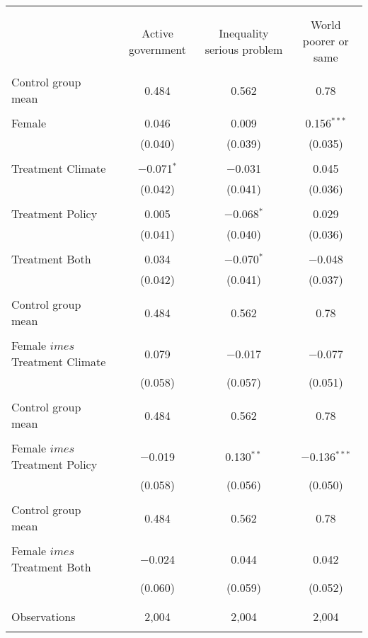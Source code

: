 
\begin{tabular}{@{\extracolsep{5pt}}lccc} 
\\[-1.8ex]\hline 
\hline \\[-1.8ex] 
\\[-1.8ex] & Active government & Inequality serious problem & World poorer or same \\ 
\hline \\[-1.8ex] 
 Control group mean & 0.484 & 0.562 & 0.78  \\ \hline \\[-1.8ex] Female & 0.046 & 0.009 & 0.156$^{***}$ \\ 
  & (0.040) & (0.039) & (0.035) \\ 
  & & & \\ 
 Treatment Climate & $-$0.071$^{*}$ & $-$0.031 & 0.045 \\ 
  & (0.042) & (0.041) & (0.036) \\ 
  & & & \\ 
 Treatment Policy & 0.005 & $-$0.068$^{*}$ & 0.029 \\ 
  & (0.041) & (0.040) & (0.036) \\ 
  & & & \\ 
 Treatment Both & 0.034 & $-$0.070$^{*}$ & $-$0.048 \\ 
  & (0.042) & (0.041) & (0.037) \\ 
  & & & \\ 
 Control group mean & 0.484 & 0.562 & 0.78  \\ \hline \\[-1.8ex] Female $	imes$ Treatment Climate & 0.079 & $-$0.017 & $-$0.077 \\ 
  & (0.058) & (0.057) & (0.051) \\ 
  & & & \\ 
 Control group mean & 0.484 & 0.562 & 0.78  \\ \hline \\[-1.8ex] Female $	imes$ Treatment Policy & $-$0.019 & 0.130$^{**}$ & $-$0.136$^{***}$ \\ 
  & (0.058) & (0.056) & (0.050) \\ 
  & & & \\ 
 Control group mean & 0.484 & 0.562 & 0.78  \\ \hline \\[-1.8ex] Female $	imes$ Treatment Both & $-$0.024 & 0.044 & 0.042 \\ 
  & (0.060) & (0.059) & (0.052) \\ 
  & & & \\ 
\hline \\[-1.8ex] 

Observations & 2,004 & 2,004 & 2,004 \\ 
\hline 
\hline \\[-1.8ex] 
\end{tabular} 